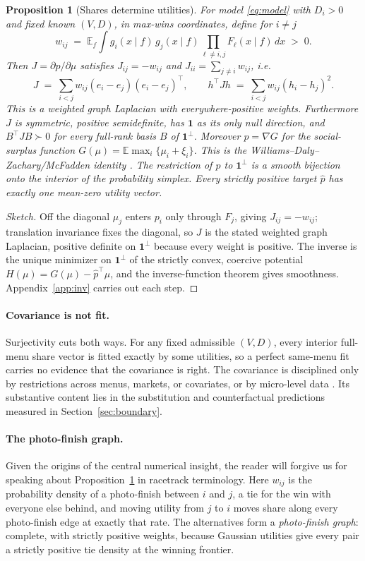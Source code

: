 \documentclass[12pt]{article}
\newtheorem{proposition}{Proposition}
\theoremstyle{remark}
\newcommand{\E}{\mathbb{E}}
\begin{document}
\begin{proposition}[Shares determine utilities]\label{thm:inv}
For model \eqref{eq:model} with $D_i > 0$ and fixed known $(V, D)$, in
max-wins coordinates, define
for $i \ne j$
\[
w_{ij} \;=\; \E_f \int g_i(x \mid f)\, g_j(x \mid f)
\prod_{\ell \ne i,j} F_\ell(x \mid f)\, dx \;>\; 0 .
\]
Then $J = \partial p / \partial \mu$ satisfies $J_{ij} = -w_{ij}$ and
$J_{ii} = \sum_{j \ne i} w_{ij}$, i.e.
\[
J \;=\; \sum_{i<j} w_{ij} (e_i - e_j)(e_i - e_j)^\top,
\qquad
h^\top J h \;=\; \sum_{i<j} w_{ij} (h_i - h_j)^2 .
\]
This is a weighted graph Laplacian with everywhere-positive weights.
Furthermore $J$ is symmetric,
positive semidefinite, has $\mathbf{1}$ as its only null direction, and
$B^\top J B \succ 0$ for every full-rank basis $B$ of $\mathbf{1}^\perp$.
Moreover $p = \nabla G$ for the social-surplus function
$G(\mu) = \E \max_i \{\mu_i + \xi_i\}$. This is the Williams--Daly--Zachary/McFadden identity \citep{williams1977,daly1978,mcfadden1981}. The restriction of $p$ to
$\mathbf{1}^\perp$ is a smooth bijection onto the interior of the
probability simplex. Every strictly positive target $\hat p$ has exactly one
mean-zero utility vector.
\end{proposition}
\begin{proof}[Sketch]
Off the diagonal $\mu_j$ enters $p_i$ only through $F_j$, giving
$J_{ij} = -w_{ij}$; translation invariance fixes the diagonal, so $J$ is
the stated weighted graph Laplacian, positive definite on
$\mathbf{1}^\perp$ because every weight is positive. The inverse is the
unique minimizer on $\mathbf{1}^\perp$ of the strictly convex, coercive
potential $H(\mu) = G(\mu) - \hat p^\top \mu$, and the inverse-function
theorem gives smoothness. Appendix~\ref{app:inv} carries out each step.
\end{proof}

\paragraph{Covariance is not fit.} Surjectivity cuts both
ways. For any fixed admissible $(V, D)$, every interior full-menu share
vector is fitted exactly by some utilities, so a perfect same-menu fit
carries no evidence that the covariance is right. The covariance is
disciplined only by restrictions across menus, markets, or covariates,
or by micro-level data \citep{chang2022}. Its substantive content lies
in the substitution and counterfactual predictions measured in
Section~\ref{sec:boundary}.

\paragraph{The photo-finish graph.} Given the origins of the central numerical insight, the reader will forgive us for speaking about Proposition~\ref{thm:inv} in racetrack terminology. Here $w_{ij}$ is the probability density of a photo-finish between
$i$ and $j$, a tie for the win with everyone else behind, and moving
utility from $j$ to $i$ moves share along every photo-finish edge at
exactly that rate. The alternatives form a \emph{photo-finish graph}:
complete, with strictly positive weights, because Gaussian utilities give
every pair a strictly positive tie density at the winning frontier.
\end{document}
